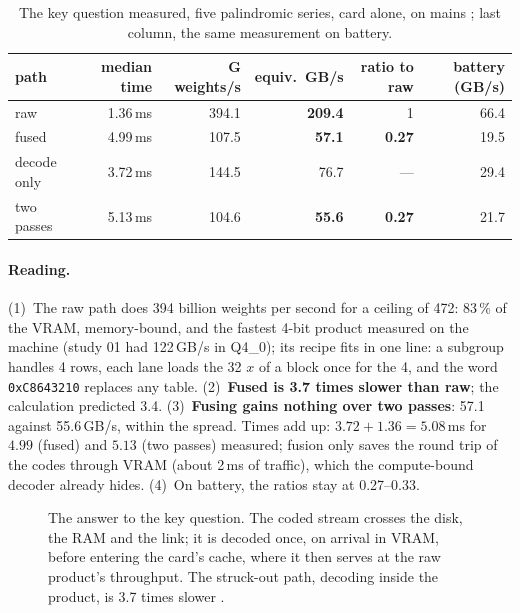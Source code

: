 \begin{table}[ht]
\centering\small
\caption[The key question, measured]{The key question measured, five palindromic series, card alone, on mains \mes; last column, the same measurement on battery.}
\label{tab:ent-gemv}
\begin{tabular}{@{}lrrrrr@{}}
\toprule
path & median time & G weights/s & equiv.\ GB/s & ratio to raw & battery (GB/s) \\
\midrule
raw & 1.36\,ms & 394.1 & \textbf{209.4} & 1 & 66.4 \\
fused & 4.99\,ms & 107.5 & \textbf{57.1} & \textbf{0.27} & 19.5 \\
decode only & 3.72\,ms & 144.5 & 76.7 & --- & 29.4 \\
two passes & 5.13\,ms & 104.6 & \textbf{55.6} & \textbf{0.27} & 21.7 \\
\bottomrule
\end{tabular}
\end{table}

\paragraph{Reading.} (1)~The raw path does 394 billion weights per second for a ceiling of 472: 83\,\% of the VRAM, memory-bound, and the fastest 4-bit product measured on the machine (study 01 had 122\,GB/s in Q4\_0); its recipe fits in one line: a subgroup handles 4 rows, each lane loads the 32 $x$ of a block once for the 4, and the word \texttt{0xC8643210} replaces any table. (2)~\textbf{Fused is 3.7 times slower than raw}; the calculation predicted 3.4. (3)~\textbf{Fusing gains nothing over two passes}: 57.1 against 55.6\,GB/s, within the spread. Times add up: $3.72 + 1.36 = 5.08$\,ms for $4.99$ (fused) and $5.13$ (two passes) measured; fusion only saves the round trip of the codes through VRAM (about 2\,ms of traffic), which the compute-bound decoder already hides. (4)~On battery, the ratios stay at 0.27--0.33.

\begin{figure}[ht]
\centering
\resizebox{\linewidth}{!}{\SchemaOuDecoder}
\caption[Where to decode: on arrival of the chunk]{The answer to the key question. The coded stream crosses the disk, the RAM and the link; it is decoded once, on arrival in VRAM, before entering the card's cache, where it then serves at the raw product's throughput. The struck-out path, decoding inside the product, is 3.7 times slower \mes.}
\label{fig:ent-ou}
\end{figure}

